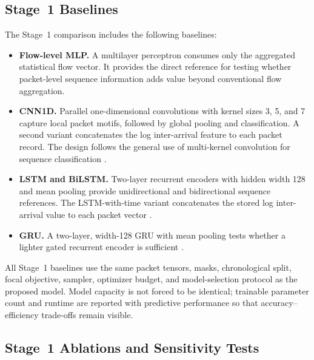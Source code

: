 \documentclass[11pt,fleqn]{report}
\begin{document}
\subsection{Stage~1 Baselines}
\label{subsubsec:stage1_baselines}

The Stage~1 comparison includes the following baselines:

\begin{itemize}[leftmargin=*]
    \item \textbf{Flow-level MLP.} A multilayer perceptron consumes only the aggregated statistical flow vector. It provides the direct reference for testing whether packet-level sequence information adds value beyond conventional flow aggregation.

    \item \textbf{CNN1D.} Parallel one-dimensional convolutions with kernel sizes 3, 5, and 7 capture local packet motifs, followed by global pooling and classification. A second variant concatenates the log inter-arrival feature to each packet record. The design follows the general use of multi-kernel convolution for sequence classification \cite{Kim2014CNN}.

    \item \textbf{LSTM and BiLSTM.} Two-layer recurrent encoders with hidden width 128 and mean pooling provide unidirectional and bidirectional sequence references. The LSTM-with-time variant concatenates the stored log inter-arrival value to each packet vector
    \cite{Hochreiter1997LSTM}.

    \item \textbf{GRU.} A two-layer, width-128 GRU with mean pooling tests whether a lighter gated recurrent encoder is sufficient \cite{Cho2014GRU}.

\end{itemize}

All Stage~1 baselines use the same packet tensors, masks, chronological split, focal objective, sampler, optimizer budget, and model-selection protocol as the proposed model. Model capacity is not forced to be identical; trainable parameter count and runtime are reported with predictive performance so that accuracy--efficiency trade-offs remain visible.

\subsection{Stage~1 Ablations and Sensitivity Tests}
\label{subsubsec:stage1_ablation_protocol}
\end{document}
